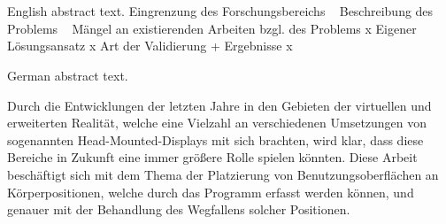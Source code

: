 \chapter{\abstractname}

English abstract text.
Eingrenzung des Forschungsbereichs								~
Beschreibung des Problems										~
Mängel an existierenden Arbeiten bzgl. des Problems				x
Eigener Lösungsansatz											x
Art der Validierung + Ergebnisse								x

\vspace{0.5in}

\noindent German abstract text.

Durch die Entwicklungen der letzten Jahre in den Gebieten der virtuellen und erweiterten Realität, welche eine Vielzahl an verschiedenen Umsetzungen von sogenannten Head-Mounted-Displays mit sich brachten, wird klar, dass diese Bereiche in Zukunft eine immer größere Rolle spielen könnten. 
Diese Arbeit beschäftigt sich mit dem Thema der Platzierung von Benutzungsoberflächen an Körperpositionen, welche durch das Programm erfasst werden können, und genauer mit der Behandlung des Wegfallens solcher Positionen. 


\makeatletter
{}
{\renewcommand{\abstractname}{Zusammenfassung}}
{\renewcommand{\abstractname}{Abstract}}
\makeatother



\makeatletter
{}
{\renewcommand{\abstractname}{Abstract}}
{\renewcommand{\abstractname}{Zusammenfassung}}
\makeatother